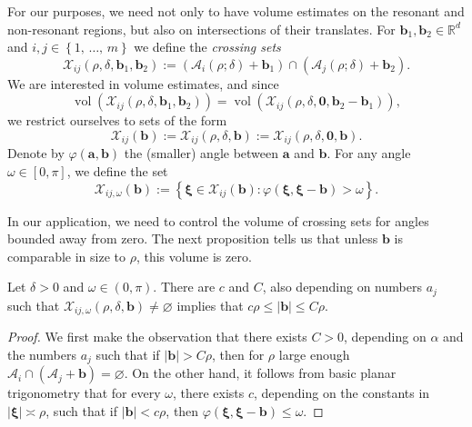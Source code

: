 \documentclass[AHL,Unicode,longabstracts,published]{cedram}
\DeclareMathOperator{\vol}{vol}
\newcommand{\R}{\mathbb R}
\newcommand{\CA}{\mathcal{A}}
\newcommand{\CX}{\mathcal{X}}
\newcommand{\bxi}{\boldsymbol \xi}
\newcommand{\bzero}{\boldsymbol 0}
\newcommand{\ba}{\mathbf a}
\newcommand{\bb}{\mathbf b}
\newcommand{\bbb}{\mathbf b}
\renewcommand{\phi}{\varphi}
\newcommand{\abs}[1]{\left\lvert #1 \right\rvert}
\newcommand{\set}[1]{\left\{ #1 \right\}}
\begin{document}
For our purposes, we need not only to have volume estimates on the resonant and non-resonant regions, but also on intersections of their translates. For $\bb_1,\bb_2 \in \R^d$ and $i,j \in \set{1,\,\dotsc,\,m}$ we define the
\emph{crossing sets}
\begin{equation}\label{eq:defCX}
\CX_{ij}(\rho,\delta,\bb_1,\bb_2) := (\CA_i(\rho;\delta)+\bb_1)\cap(\CA_j(\rho;\delta)+\bb_2).
\end{equation}
We are interested in volume estimates, and since
\begin{equation}
\vol(\CX_{ij}(\rho,\delta,\bb_1,\bb_2)) =
\vol(\CX_{ij}(\rho,\delta,\bzero,\bb_2-\bb_1)),
\end{equation}
we restrict ourselves to sets of the form
\begin{equation}
\CX_{ij}(\bb) := \CX_{ij}(\rho,\delta,\bb) :=
\CX_{ij}(\rho,\delta,\bzero,\bb).
\end{equation}
Denote by $\phi(\ba,\bb)$ the (smaller) angle between $\ba$ and $\bb$. For any angle $\omega \in [0,\pi]$, we define the set
\begin{equation}\label{eq:badvol}
\CX_{ij,\omega}(\bb) := \set{\bxi \in \CX_{ij}(\bb) : \phi(\bxi,\bxi-\bb) >
\omega}.
\end{equation}

In our application, we need to control the volume of crossing sets for angles bounded away from zero. The next proposition tells us that unless $\bbb$ is comparable in size to $\rho$, this volume is zero.
\begin{prop}\label{rem:xemptyint}
Let $\delta > 0$ and $\omega \in (0,\pi)$. There are $c$ and $C$, also depending on numbers $a_j$ such that $\CX_{ij,\omega}(\rho,\delta,\bb) \ne \varnothing$ implies that $c \rho \le \abs\bb \le C\rho$.
\end{prop}

\begin{proof}
We first make the observation that there exists $C > 0$, depending on $\alpha$ and the numbers $a_j$ such that if $\abs \bbb > C\rho$, then for $\rho$ large enough $\CA_i \cap (\CA_j + \bbb) = \varnothing$. On the other hand, it follows from basic planar trigonometry that for every $\omega$, there exists $c$, depending on the constants in $\abs\bxi \asymp \rho$, such that if $\abs \bbb < c \rho$, then $\phi(\bxi, \bxi-\bbb)\le \omega$.
\end{proof}
\end{document}
